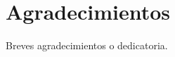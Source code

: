 \documentclass[12pt,twoside,titlepage]{report}
\newcommand{\nombreautor}{Cristina González de Lope}
\newcommand{\nombretutor}{Cristian Gómez Macías}
\newcommand{\titulotrabajo}{DESARROLLO DE UN LENGUAJE ESPECÍFICO DE DOMINIO PARA LA CONFIGURACIÓN DE AGENTES DE IA Y FLUJOS LOW-CODE SOBRE BASES DE DATOS NOSQL}
\newcommand{\escuelalargo}{Escuela Técnica Superior de Ingeniería Informática}
\newcommand{\universidad}{Universidad Rey Juan Carlos}
\newcommand{\fecha}{Fecha}
\newcommand\blankpage{%
    \newpage
    \null
    \thispagestyle{empty}%
    \newpage}
\begin{document}








\hypersetup{pageanchor=true}

\normalsize
\afterpage{\blankpage} %



\setlength{\parskip}{0.75em}
\renewcommand{\baselinestretch}{1.25}

\setcounter{page}{2}



\chapter*{Agradecimientos}

Breves agradecimientos o dedicatoria.

\afterpage{\blankpage}

\end{document}
